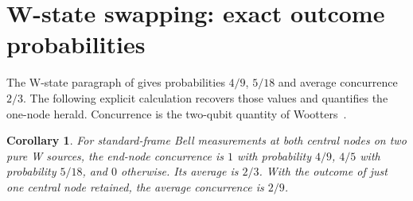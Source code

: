 \documentclass[11pt,a4paper]{article}
\newtheorem{corollary}[theorem]{Corollary}
\begin{document}
\section{W-state swapping: exact outcome probabilities}
The W-state paragraph of \cite[Section IV, p.~6]{CK} gives probabilities
$4/9$, $5/18$ and average concurrence $2/3$. The following explicit
calculation recovers those values and quantifies the one-node herald.
Concurrence is the two-qubit quantity of Wootters~\cite{Wootters}.

\begin{corollary}\label{cor:swapping}
For standard-frame Bell measurements at both central nodes on two pure
W sources, the end-node concurrence is $1$ with probability $4/9$,
$4/5$ with probability $5/18$, and $0$ otherwise. Its average is $2/3$.
With the outcome of just one central node retained, the average
concurrence is $2/9$.
\end{corollary}
\end{document}
